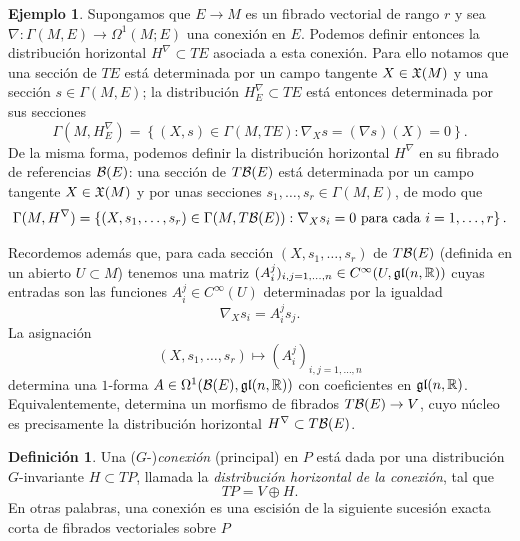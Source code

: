 \documentclass[11pt,a4paper]{amsbook}
\theoremstyle{remark} \newtheorem{rmk}[subsection]{Observación}
\theoremstyle{definition} \newtheorem{defn}[subsection]{Definición}
\theoremstyle{definition} \newtheorem{ex}[subsection]{Ejemplo}
\theoremstyle{definition} \newtheorem{ej}[subsection]{Ejercicio}
\begin{document}
\begin{ex}
Supongamos que $E\rightarrow M$ es un fibrado vectorial de rango $r$ y sea $\nabla:\Gamma(M,E)\rightarrow \Omega^1(M;E)$ una conexión en $E$. Podemos definir entonces la distribución horizontal $H^\nabla\subset TE$ asociada a esta conexión. Para ello notamos que una sección de $TE$ está determinada por un campo tangente $X \in \mathfrak X(M)$ y una sección $s \in \Gamma(M,E)$; la distribución $H_E^\nabla \subset TE$ está entonces determinada por sus secciones
\begin{equation*}
  \Gamma(M,H_E^\nabla) = \left\{ (X,s) \in \Gamma(M,TE): \nabla_X s= (\nabla s)(X) = 0 \right\}.
\end{equation*}
De la misma forma, podemos definir la distribución horizontal $H^\nabla$ en su fibrado de referencias $\mathcal B(E)$: una sección de $T\mathcal B(E)$ está determinada por un campo tangente $X\in \mathfrak X(M)$ y por unas secciones $s_1,\dots,s_r \in \Gamma(M,E)$, de modo que
\begin{equation*}
  \Gamma(M,H^\nabla) = \left\{ (X,s_1,\dots,s_r) \in \Gamma(M,T\mathcal B(E)): \nabla_X s_i = 0 \text{ para cada }i=1,\dots,r \right\}.
\end{equation*}

Recordemos además que, para cada sección $(X,s_1,\dots,s_r)$ de $T\mathcal B(E)$ (definida en un abierto $U\subset M$) tenemos una matriz $(A_{i}^j)_{i,j=1,\dots,n} \in C^\infty(U,\mathfrak{gl}(n,\mathbb R))$ cuyas entradas son las funciones $A_i^j\in C^\infty(U)$ determinadas por la igualdad
\begin{equation*}
\nabla_X s_i = A_i^j s_j.
\end{equation*}
La asignación
\begin{equation*}
(X,s_1,\dots,s_r) \mapsto (A_{i}^j)_{i,j=1,\dots,n}
\end{equation*}
determina una $1$-forma $A \in \Omega^1(\mathcal B(E),\mathfrak{gl}(n,\mathbb R))$ con coeficientes en $\mathfrak{gl}(n,\mathbb R)$. Equivalentemente, determina un morfismo de fibrados $T\mathcal B(E)\rightarrow V$, cuyo núcleo es precisamente la distribución horizontal $H^\nabla \subset T\mathcal B(E)$.



\end{ex}

\begin{defn}
  Una ($G$-)\emph{conexión} (principal) en $P$ está dada por una distribución $G$-invariante $H\subset TP$, llamada la \emph{distribución horizontal de la conexión}, tal que
  \begin{equation*}
TP = V \oplus H.
  \end{equation*}
  En otras palabras, una conexión es una escisión de la siguiente sucesión exacta corta de fibrados vectoriales sobre $P$
  \begin{center}
  \end{center}
\end{defn}
\end{document}
